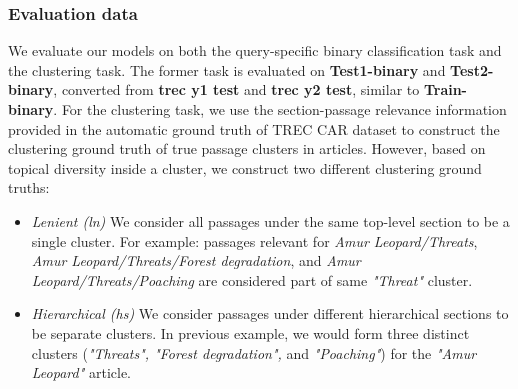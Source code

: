 \subsubsection{Evaluation data} We evaluate our models on both the query-specific binary classification task and the clustering task. The former task is evaluated on \textbf{Test1-binary} and \textbf{Test2-binary}, converted from \textbf{trec y1 test} and \textbf{trec y2 test}, similar to \textbf{Train-binary}. For the clustering task, we use the section-passage relevance information provided in the automatic ground truth of TREC CAR dataset to construct the clustering ground truth of true passage clusters in articles. However, based on topical diversity inside a cluster, we construct two different clustering ground truths:

\begin{itemize}[leftmargin=.15in]
    \item \textit{Lenient (ln)} We consider all passages under the same top-level section to be a single cluster. For example: passages relevant for \textit{Amur Leopard/Threats}, \textit{Amur Leopard/Threats/Forest degradation}, and \textit{Amur Leopard/Threats/Poaching} are considered part of same \textit{"Threat"} cluster.
    \item \textit{Hierarchical (hs)} We consider passages under different hierarchical sections to be separate clusters. In previous example, we would form three distinct clusters (\textit{"Threats", "Forest degradation",} and \textit{"Poaching"}) for the \textit{"Amur Leopard"} article.
\end{itemize}

